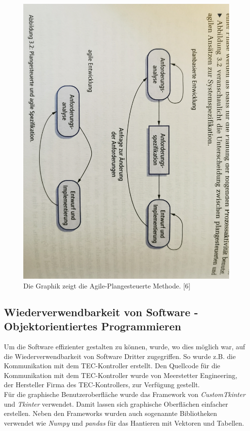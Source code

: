 \begin{figure}[H]
    \centering
    \includegraphics[scale=0.07, angle=90, clip]{98_images/plangesteuerte_agile_development.jpg}
    \caption{Die Graphik zeigt die Agile-Plangesteuerte Methode. [6]}
    \label{fig:agile_method}
\end{figure}


\subsection{Wiederverwendbarkeit von Software - Objektorientiertes Programmieren}
Um die Software effizienter gestalten zu können, wurde, wo dies möglich war, auf die Wiederverwendbarkeit von Software Dritter zugegriffen. So wurde z.B. die Kommunikation mit dem TEC-Kontroller erstellt. Den Quellcode für die Kommunikation mit dem TEC-Kontroller wurde von Meerstetter Engineering, der Hersteller Firma des TEC-Kontrollers, zur Verfügung gestellt.\\
Für die graphische Benutzeroberfläche wurde das Framework von \textit{CustomTkinter} und \textit{Tkinter} verwendet. Damit lassen sich graphische Oberflächen einfacher erstellen. Neben den Frameworks wurden auch sogenannte Bibliotheken verwendet wie \textit{Numpy} und \textit{pandas} für das Hantieren mit Vektoren und Tabellen.\\

